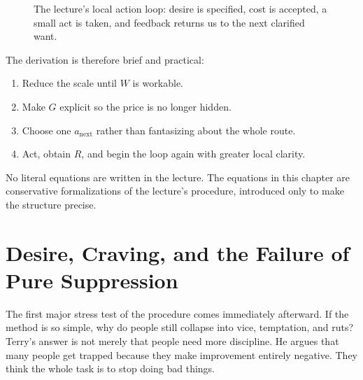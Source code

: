 \begin{figure}[h]
\centering
{}
\caption{The lecture's local action loop: desire is specified, cost is accepted, a small act is taken, and feedback returns us to the next clarified want.}
\end{figure}

The derivation is therefore brief and practical:
\begin{enumerate}
\item Reduce the scale until \(W\) is workable.
\item Make \(G\) explicit so the price is no longer hidden.
\item Choose one \(a_{\text{next}}\) rather than fantasizing about the whole route.
\item Act, obtain \(R\), and begin the loop again with greater local clarity.
\end{enumerate}

\begin{remark}
No literal equations are written in the lecture. The equations in this chapter are conservative formalizations of the lecture's procedure, introduced only to make the structure precise.
\end{remark}

\section{Desire, Craving, and the Failure of Pure Suppression}

The first major stress test of the procedure comes immediately afterward. If the method is so simple, why do people still collapse into vice, temptation, and ruts? Terry's answer is not merely that people need more discipline. He argues that many people get trapped because they make improvement entirely negative. They think the whole task is to stop doing bad things.


